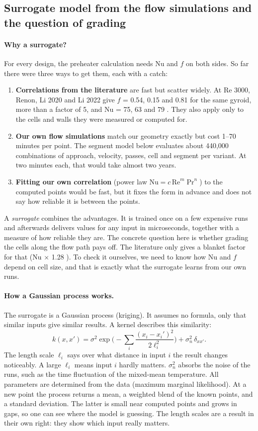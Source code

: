 \subsection{Surrogate model from the flow simulations and the question of grading}\label{sec:exchangersurrogate}

\paragraph{Why a surrogate?} For every design, the preheater calculation needs Nu and $f$ on both sides. So far there
were three ways to get them, each with a catch:
\begin{enumerate}
\item \textbf{Correlations from the literature} are fast but scatter widely. At Re 3000, Renon, Li 2020 and Li 2022
  give $f$ = 0.54, 0.15 and 0.81 for the same gyroid, more than a factor of 5, and Nu = 75, 63 and 79
  \cite{renon2024,alsafadi2026}. They also apply only to the cells and walls they were measured or computed for.
\item \textbf{Our own flow simulations} match our geometry exactly but cost 1--70 minutes per point. The segment model
  below evaluates about 440,000 combinations of approach, velocity, passes, cell and segment per variant. At two
  minutes each, that would take almost two years.
\item \textbf{Fitting our own correlation} (power law $\mathrm{Nu} = c\,\mathrm{Re}^m\Pr^n$) to the computed points
  would be fast, but it fixes the form in advance and does not say how reliable it is between the points.
\end{enumerate}
A \emph{surrogate} combines the advantages. It is trained once on a few expensive runs and afterwards delivers values
for any input in microseconds, together with a measure of how reliable they are. The concrete question here is whether
grading the cells along the flow path pays off. The literature only gives a blanket factor for that (Nu $\times$ 1.28
\cite{oh2025}). To check it ourselves, we need to know how Nu and $f$ depend on cell size, and that is exactly what the
surrogate learns from our own runs.

\paragraph{How a Gaussian process works.} The surrogate is a Gaussian process (kriging). It assumes no formula, only that
similar inputs give similar results. A kernel describes this similarity:
\[
  k(x,x') = \sigma^2 \exp\Big(-\sum_i \frac{(x_i-x_i')^2}{2\ell_i^2}\Big) + \sigma_n^2\,\delta_{xx'}.
\]
The length scale $\ell_i$ says over what distance in input $i$ the result changes noticeably. A large $\ell_i$ means
input $i$ hardly matters. $\sigma_n^2$ absorbs the noise of the runs, such as the time fluctuation of the mixed-mean
temperature. All parameters are determined from the data (maximum marginal likelihood). At a new point the process
returns a mean, a weighted blend of the known points, and a standard deviation. The latter is small near computed points
and grows in gaps, so one can see where the model is guessing. The length scales are a result in their own right: they
show which input really matters.

